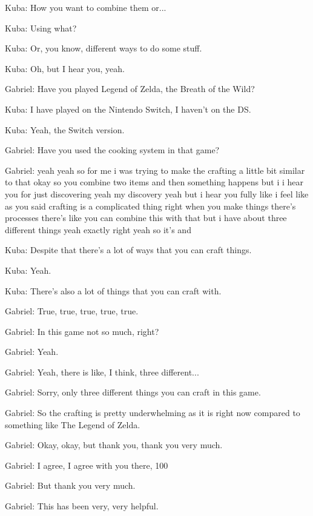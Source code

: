 Kuba: How you want to combine them or...

Kuba: Using what?

Kuba: Or, you know, different ways to do some stuff.

Kuba: Oh, but I hear you, yeah.

Gabriel: Have you played Legend of Zelda, the Breath of the Wild?

Kuba: I have played on the Nintendo Switch, I haven't on the DS.

Kuba: Yeah, the Switch version.

Gabriel: Have you used the cooking system in that game?

Gabriel: yeah yeah so for me i was trying to make the crafting a little bit similar to that okay so you combine two items and then something happens but i i hear you for just discovering yeah my discovery yeah but i hear you fully like i feel like as you said crafting is a complicated thing right when you make things there's processes there's like you can combine this with that but i have about three different things yeah exactly right yeah so it's and

Kuba: Despite that there's a lot of ways that you can craft things.

Kuba: Yeah.

Kuba: There's also a lot of things that you can craft with.

Gabriel: True, true, true, true, true.

Gabriel: In this game not so much, right?

Gabriel: Yeah.

Gabriel: Yeah, there is like, I think, three different...

Gabriel: Sorry, only three different things you can craft in this game.

Gabriel: So the crafting is pretty underwhelming as it is right now compared to something like The Legend of Zelda.

Gabriel: Okay, okay, but thank you, thank you very much.

Gabriel: I agree, I agree with you there, 100%

Gabriel: But thank you very much.

Gabriel: This has been very, very helpful.

